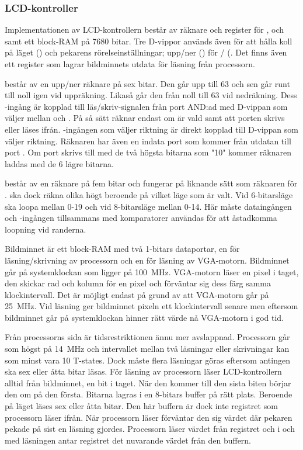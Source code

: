 \documentclass[main.tex]{subfiles}
\begin{document}
\subsubsection{LCD-kontroller}
Implementationen av LCD-kontrollern består av räknare och register för
,  och  samt ett block-RAM på 7680 bitar. Tre D-vippor
används även för att hålla koll på läget () och pekarens
rörelseinställningar; upp/ner () för /
(. Det finns även ett register som lagrar bildminnets utdata för
läsning från processorn.

 består av en upp/ner räknare på sex bitar. Den går upp till 63 och sen
går runt till noll igen vid uppräkning. Likaså går den från noll till 63 vid
nedräkning. Dess -ingång är kopplad till läs/skriv-signalen från port
 AND:ad med D-vippan som väljer mellan  och . På så
sätt räknar  endast om  är vald samt att porten skrivs eller
läses ifrån. -ingången som väljer riktning är direkt kopplad till
D-vippan som väljer riktning. Räknaren har även en indata port som kommer från
utdatan till port . Om port  skrivs till med de två högsta
bitarna som "10" kommer räknaren laddas med de 6 lägre bitarna.

 består av en räknare på fem bitar och fungerar på liknande sätt som
räknaren för .  ska dock räkna olika högt beroende på vilket
läge som är valt. Vid 6-bitarsläge ska  loopa mellan 0-19 och vid
8-bitarsläge mellan 0-14. Här måste dataingången och -ingången
tillsammans med komparatorer användas för att åstadkomma loopning vid randerna.

Bildminnet är ett block-RAM med två 1-bitars dataportar, en för
läsning/skrivning av processorn och en för läsning av VGA-motorn. Bildminnet
går på systemklockan som ligger på \SI{100}{\mega\hertz}. VGA-motorn läser en
pixel i taget, den skickar rad och kolumn för en pixel och förväntar sig dess
färg samma klockintervall. Det är möjligt endast på grund av att VGA-motorn går
på \SI{25}{\mega\hertz}. Vid läsning ger bildminnet pixeln ett klockintervall
senare men eftersom bildminnet går på systemklockan hinner rätt värde nå
VGA-motorn i god tid.

Från processorns sida är tidsrestriktionen ännu mer avslappnad. Processorn går
som högst på \SI{14}{\mega\hertz} och intervallet mellan två läsningar eller
skrivningar kan som minst vara 10 T-states. Dock måste flera läsningar göras
eftersom antingen ska sex eller åtta bitar läsas. För läsning av processorn
läser LCD-kontrollern alltid från bildminnet, en bit i taget. När den kommer
till den sista biten börjar den om på den första. Bitarna lagras i en 8-bitars
buffer på rätt plats. Beroende på läget läses sex eller åtta bitar. Den här
buffern är dock inte registret som processorn läser ifrån. När processorn läser
förväntar den sig värdet där pekaren pekade på sist en läsning gjordes.
Processorn läser värdet från registret och i och med läsningen antar registret
det nuvarande värdet från den buffern.
\end{document}
